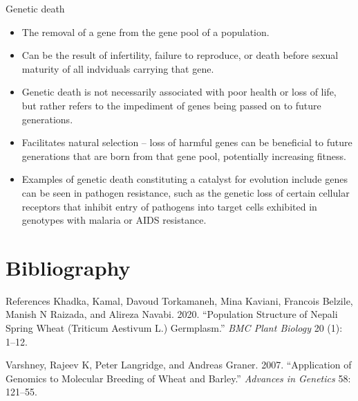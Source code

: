 \documentclass[11pt,dvipsnames,ignorenonframetext,aspectratio=169]{beamer}
\providecommand{\tightlist}{%
  \setlength{\itemsep}{0pt}\setlength{\parskip}{0pt}}
\newlength{\cslhangindent}
\newenvironment{cslreferences}%
    {\setlength{\parindent}{0pt}%
    \everypar{\setlength{\hangindent}{\cslhangindent}}\ignorespaces}%
    {\par}
\begin{document}
\begin{frame}{Genetic death}
\protect\hypertarget{genetic-death}{}
\begin{itemize}
\tightlist
\item
  The removal of a gene from the gene pool of a population.
\item
  Can be the result of infertility, failure to reproduce, or death
  before sexual maturity of all indviduals carrying that gene.
\item
  Genetic death is not necessarily associated with poor health or loss
  of life, but rather refers to the impediment of genes being passed on
  to future generations.
\item
  Facilitates natural selection -- loss of harmful genes can be
  beneficial to future generations that are born from that gene pool,
  potentially increasing fitness.
\item
  Examples of genetic death constituting a catalyst for evolution
  include genes can be seen in pathogen resistance, such as the genetic
  loss of certain cellular receptors that inhibit entry of pathogens
  into target cells exhibited in genotypes with malaria or AIDS
  resistance.
\end{itemize}
\end{frame}

\hypertarget{bibliography}{%
\section{Bibliography}\label{bibliography}}

\begin{frame}{References}
\protect\hypertarget{references}{}
\hypertarget{refs}{}
\begin{cslreferences}
\leavevmode\hypertarget{ref-khadka2020population}{}%
Khadka, Kamal, Davoud Torkamaneh, Mina Kaviani, Francois Belzile, Manish
N Raizada, and Alireza Navabi. 2020. ``Population Structure of Nepali
Spring Wheat (Triticum Aestivum L.) Germplasm.'' \emph{BMC Plant
Biology} 20 (1): 1--12.

\leavevmode\hypertarget{ref-varshney2007application}{}%
Varshney, Rajeev K, Peter Langridge, and Andreas Graner. 2007.
``Application of Genomics to Molecular Breeding of Wheat and Barley.''
\emph{Advances in Genetics} 58: 121--55.
\end{cslreferences}
\end{frame}
\end{document}

